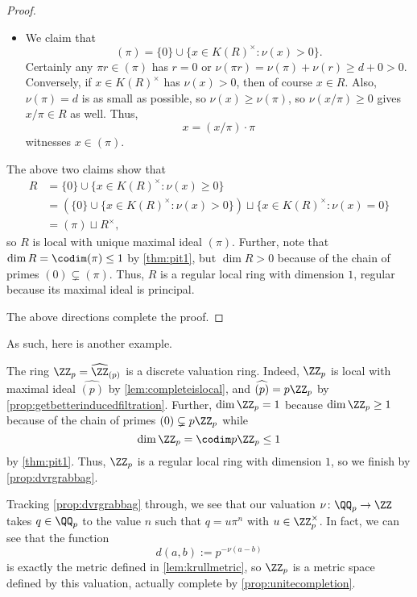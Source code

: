 \begin{proof}
\begin{itemize}
\begin{itemize}
			\item We claim that
			\[(\pi)=\{0\}\cup\{x\in K(R)^\times:\nu(x)>0\}.\]
			Certainly any $\pi r\in(\pi)$ has $r=0$ or $\nu(\pi r)=\nu(\pi)+\nu(r)\ge d+0>0$. Conversely, if $x\in K(R)^\times$ has $\nu(x)>0$, then of course $x\in R$. Also, $\nu(\pi)=d$ is as small as possible, so $\nu(x)\ge\nu(\pi)$, so $\nu(x/\pi)\ge0$ gives $x/\pi\in R$ as well. Thus,
			\[x=(x/\pi)\cdot\pi\]
			witnesses $x\in(\pi)$.
		\end{itemize}
		The above two claims show that
		\begin{align*}
			R &= \{0\}\cup\{x\in K(R)^\times:\nu(x)\ge0\} \\
			&= \left(\{0\}\cup\{x\in K(R)^\times:\nu(x)>0\}\right)\sqcup\{x\in K(R)^\times:\nu(x)=0\} \\
			&=(\pi)\sqcup R^\times,
		\end{align*}
		so $R$ is local with unique maximal ideal $(\pi)$. Further, note that $\dim R=\codim(\pi)\le1$ by \autoref{thm:pit1}, but $\dim R>0$ because of the chain of primes $(0)\subsetneq(\pi)$. Thus, $R$ is a regular local ring with dimension $1$, regular because its maximal ideal is principal.
	\end{itemize}
	The above directions complete the proof.
\end{proof}
As such, here is another example.
\begin{example}
	The ring $\ZZ_p=\widehat{\ZZ}_{(p)}$ is a discrete valuation ring. Indeed, $\ZZ_p$ is local with maximal ideal $\widehat{(p)}$ by \autoref{lem:completeislocal}, and $\widehat{(p)}=p\ZZ_p$ by \autoref{prop:getbetterinducedfiltration}. Further, $\dim\ZZ_p=1$ because $\dim\ZZ_p\ge1$ because of the chain of primes $(0)\subsetneq p\ZZ_p$ while
	\[\dim\ZZ_p=\codim p\ZZ_p\le1\]
	by \autoref{thm:pit1}. Thus, $\ZZ_p$ is a regular local ring with dimension $1$, so we finish by \autoref{prop:dvrgrabbag}.
\end{example}
\begin{remark}
	Tracking \autoref{prop:dvrgrabbag} through, we see that our valuation $\nu\colon\QQ_p\to\ZZ$ takes $q\in\QQ_p$ to the value $n$ such that $q=u\pi^n$ with $u\in\ZZ_p^\times$. In fact, we can see that the function
	\[d(a,b):=p^{-\nu(a-b)}\]
	is exactly the metric defined in \autoref{lem:krullmetric}, so $\ZZ_p$ is a metric space defined by this valuation, actually complete by \autoref{prop:unitecompletion}.
\end{remark}

